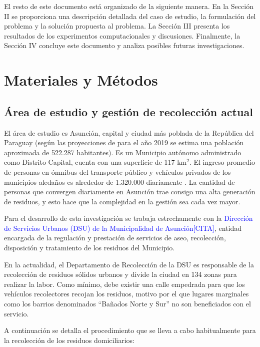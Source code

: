 \documentclass[conference,compsoc]{IEEEtran}
\begin{document}
El resto de este documento está organizado de la siguiente manera. En la Sección II se proporciona una descripción detallada del caso de estudio, la formulación del problema y la solución propuesta al problema. La Sección III presenta los resultados de los experimentos computacionales y discusiones. Finalmente, la Sección IV concluye este documento y analiza posibles futuras investigaciones.

\section{Materiales y Métodos}

\subsection{Área de estudio y gestión de recolección actual}

El área de estudio es Asunción, capital y ciudad más poblada de la República del Paraguay (según las proyecciones de \cite{2015Proyeccion2000-2025} para el año 2019 se estima una población aproximada de 522.287 habitantes). Es un Municipio autónomo administrado como Distrito Capital, cuenta con una superficie de 117 km$^{2}$. El ingreso promedio de personas en ómnibus del transporte público y vehículos privados de los municipios aledaños es alrededor de 1.320.000 diariamente \cite{DiarioABCColor2016PorColor}. La cantidad de personas que convergen diariamente en Asunción trae consigo una alta generación de residuos, y esto hace que la complejidad en la gestión sea cada vez mayor.

Para el desarrollo de esta investigación se trabaja estrechamente con la \textcolor{blue}{Dirección de Servicios Urbanos (DSU) de la Municipalidad de Asunción[CITA]}, entidad encargada de la regulación y prestación de servicios de aseo, recolección, disposición y tratamiento de los residuos del Municipio.

En la actualidad, el Departamento de Recolección de la DSU es responsable de la recolección de residuos sólidos urbanos y divide la ciudad en 134 zonas para realizar la labor. Como mínimo, debe existir una calle empedrada para que los vehículos recolectores recojan los residuos, motivo por el que lugares marginales como los barrios denominados ``Bañados Norte y Sur'' no son beneficiados con el servicio.

A continuación se detalla el procedimiento que se lleva a cabo habitualmente para la recolección de los residuos domiciliarios:
\end{document}
